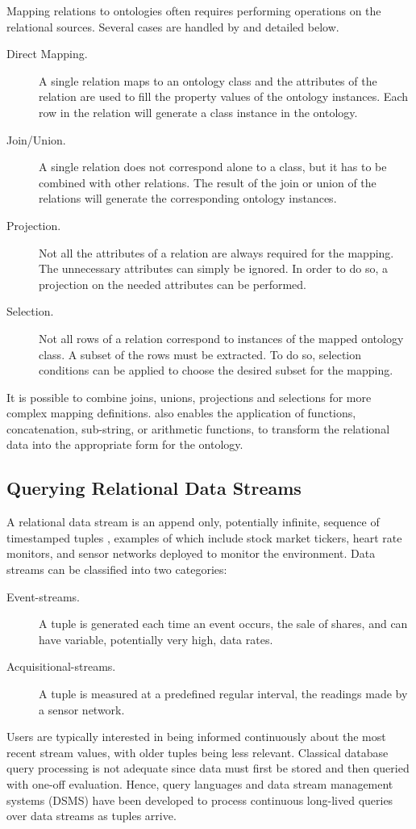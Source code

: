 Mapping relations to ontologies often requires performing operations on the relational sources.
Several cases are handled by \rtwoo and detailed below.
\begin{description}
\item[Direct Mapping.] A single relation maps to an ontology class and the attributes of the relation are used to fill the property values of the ontology instances. Each row in the relation will generate a class instance in the ontology.
\item[Join/Union.] A single relation does not correspond alone to a class, but it has to be combined with other relations. The result of the join or union of the relations will generate the corresponding ontology instances.
\item[Projection.] Not all the attributes of a relation are always required for the mapping. The unnecessary attributes can simply be ignored. In order to do so, a projection on the needed attributes can be performed.
\item[Selection.] Not all rows of a relation correspond to instances of the mapped ontology class. A subset of the rows must be extracted. To do so, selection conditions can be applied to choose the desired subset for the mapping.
\end{description}
It is possible to combine joins, unions, projections and selections for more complex mapping definitions.
\rtwoo also enables the application of functions, \eg concatenation, sub-string, or arithmetic functions, to transform the relational data into the appropriate form for the ontology.



\subsection{Querying Relational Data Streams}
\label{sec:query-relat-streams}

A relational data stream is an append only, potentially infinite, sequence of timestamped tuples \cite{Golab2003Issues-in-data-}, examples of which include stock market tickers, heart rate monitors, and sensor networks deployed to monitor the environment.
Data streams can be classified into two categories:
\begin{description}
\item[Event-streams.] A tuple is generated each time an event occurs, \eg the sale of shares, and can have variable, potentially very high, data rates.
\item[Acquisitional-streams.] A tuple is measured at a predefined regular interval, \eg the readings made by a sensor network.
\end{description}
Users are typically interested in being informed continuously about the most recent stream values, with older tuples being less relevant.
Classical database query processing is not adequate since data must first be stored and then queried with one-off evaluation.
Hence, query languages \cite{Brenninkmeijer_08,Arasu_2006} and data stream management systems (DSMS) \cite{Arasu_06a,Abadi_2005,Galpin_09,Madden_05} have been developed to process continuous long-lived queries over data streams as tuples arrive.

